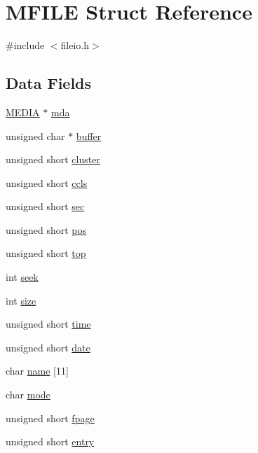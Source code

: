 \hypertarget{struct_m_f_i_l_e}{\section{M\-F\-I\-L\-E Struct Reference}
\label{struct_m_f_i_l_e}
}


{\ttfamily \#include $<$fileio.\-h$>$}

\subsection*{Data Fields}
\begin{DoxyCompactItemize}
\item 
\hyperlink{struct_m_e_d_i_a}{M\-E\-D\-I\-A} $\ast$ \hyperlink{struct_m_f_i_l_e_a60a723e90d275009f5a327db27ba0972}{mda}
\item 
unsigned char $\ast$ \hyperlink{struct_m_f_i_l_e_a70e7ad2e1a45c8db5fba9ad4778bd400}{buffer}
\item 
unsigned short \hyperlink{struct_m_f_i_l_e_a17846faf54d8f2b8a1dcf87afd2a9775}{cluster}
\item 
unsigned short \hyperlink{struct_m_f_i_l_e_aca8da61849ae0d7b02b5cb16d10f49d9}{ccls}
\item 
unsigned short \hyperlink{struct_m_f_i_l_e_a2080d32eab8db36848f7e4af7976dd84}{sec}
\item 
unsigned short \hyperlink{struct_m_f_i_l_e_a23444e2bb0bb33d50004192d64be2590}{pos}
\item 
unsigned short \hyperlink{struct_m_f_i_l_e_a5c1244c5c185fad943dea5b4ffb5cef5}{top}
\item 
int \hyperlink{struct_m_f_i_l_e_ae9fff3db126e97d7628ae0cf472e47b7}{seek}
\item 
int \hyperlink{struct_m_f_i_l_e_a439227feff9d7f55384e8780cfc2eb82}{size}
\item 
unsigned short \hyperlink{struct_m_f_i_l_e_a9e291d833ba33b59d6063a0cd586a86b}{time}
\item 
unsigned short \hyperlink{struct_m_f_i_l_e_aa5308fb86cfb276522804ceec15b7efe}{date}
\item 
char \hyperlink{struct_m_f_i_l_e_afb5f90328f746a429516e6c9b1a069e2}{name} \mbox{[}11\mbox{]}
\item 
char \hyperlink{struct_m_f_i_l_e_a000e34997df38c2005a83d63e67d9282}{mode}
\item 
unsigned short \hyperlink{struct_m_f_i_l_e_a90e0ec4ff8507af26396f8eee99ebd52}{fpage}
\item 
unsigned short \hyperlink{struct_m_f_i_l_e_aca0461bffb12ab51bb48e6684f46dc43}{entry}
\end{DoxyCompactItemize}


